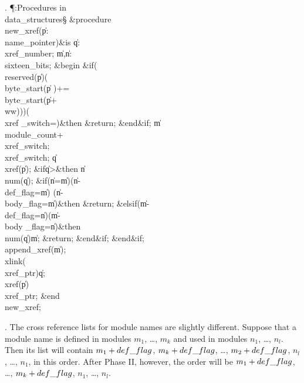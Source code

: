 . \P\?:Procedures in \\{data\_structures}\X\mathrel{+}\S\?\6
\&{procedure}\8\1\\{new\_xref}\?(\1\?\|p\?:\?\\{name\_pointer}\?\2)\?\2\8\&{is}%
\8\1\6
\|q\?:\?\\{xref\_number};\6
\|m\?,\?\|n\?:\?\\{sixteen\_bits};%
\6
\4\&{begin}\6
\&{if}\1\1\?\8\1(\?\\{reserved}\?\1(\?\|p\?\2)\V\1(\?\\{byte\_start}\?\1(\?\|p%
\?\2)+\?=\?\\{byte\_start}\?\1(\?\|p\?+\?\\{ww}\?\2)\2)\2)\W\1(\?\\{xref%
\_switch}\?=\?\2)\?\2\8\&{then}\6
\&{return};\2\6
\&{end}\8\2\&{if}\1;\6
\|m\?\K\?\\{module\_count}\?+\?\\{xref\_switch};\5
\\{xref\_switch}\?\K{};\5
\|q\?\K\?\\{xref}\?\1(\?\|p\?\2)\?;\6
\&{if}\1\1\8\|q\?>\2\8\&{then}\6
\|n\?\K\?\\{num}\?\1(\?\|q\?\2)\?;\6
\&{if}\1\1\?\8\1(\?\|n\?=\?\|m\?\2)\V\1(\?\|n\?-\?\\{def\_flag}\?=\?\|m\?\2)\V%
\1(\?\|n\?-\?\\{body\_flag}\?=\?\|m\?\2)\?\2\8\&{then}\6
\&{return};\6
\4\&{elsif}\1\?\8\1(\?\|m\?-\?\\{def\_flag}\?=\?\|n\?\2)\V\1(\?\|m\?-\?\\{body%
\_flag}\?=\?\|n\?\2)\?\2\8\&{then}\6
\\{num}\?\1(\?\|q\?\2)\K\?\|m;\5
\&{return};\2\6
\&{end}\8\2\&{if}\1;\2\6
\&{end}\8\2\&{if}\1;\6
\\{append\_xref}\?\1(\?\|m\?\2)\?;\5
\\{xlink}\?\1(\?\\{xref\_ptr}\?\2)\K\?\|q;\5
\\{xref}\?\1(\?\|p\?\2)\K\?\\{xref\_ptr};\2\6
\&{end}\8\\{new\_xref};\par
\fi

. The cross reference lists for module names are slightly different.
Suppose
that a module name is defined in modules $m_1$, \dots, $m_k$ and used in
modules $n_1$, \dots, $n_l$. Then its list will contain $m_1+\\{def\_flag}$,
$m_k+\\{def\_flag}$, \dots, $m_2+\\{def\_flag}$, $n_l$, \dots, $n_1$, in
this order.  After Phase II, however, the order will be
$m_1+\\{def\_flag}$, \dots, $m_k+\\{def\_flag}$, $n_1$, \dots, $n_l$.

